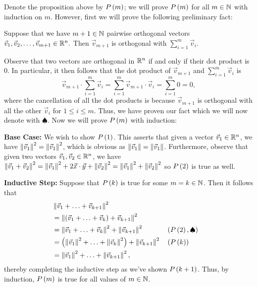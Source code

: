 \documentclass[main.tex]{subfiles}
\begin{document}
\begin{soln}
    Denote the proposition above by $P\left( m \right)$; we will prove $P\left( m \right)$ for all $m\in \mathbb N$ with induction on $m$. However, first we will prove the following preliminary fact:
    \begin{fact}
        Suppose that we have $m + 1\in \mathbb N$ pairwise orthogonal vectors $\vec{v}_{1}, \vec{v}_{2}, \ldots , \vec{v}_{m + 1} \in \mathbb R^n.$ Then $\vec{v}_{m + 1}$ is orthogonal with $\sum_{i = 1}^m \vec{v}_{i}$.
    \end{fact}
    Observe that two vectors are orthogonal in $\mathbb R^n$ if and only if their dot product is $0$. In particular, it then follows that the dot product of $\vec{v}_{m + 1}$ and $\sum_{i = 1}^m \vec{v}_{i}$ is
    \[\vec{v}_{m + 1}\cdot \sum_{i = 1}^m \vec{v}_{i} = \sum_{i = 1}^m \vec{v}_{m + 1}\cdot \vec{v}_{i} = \sum_{i = 1}^m 0 = 0,\]
    where the cancellation of all the dot products is because $\vec{v}_{m + 1}$ is orthogonal with all the other $\vec{v}_{i}$ for $1\le i\le m$. Thus, we have proven our fact which we will now denote with $\spadesuit$. Now we will prove $P\left( m \right)$ with induction:
    
    \textbf{Base Case:} We wish to show $P\left( 1 \right)$. This asserts that given a vector $\vec{v}_{1}\in \mathbb R^n$, we have $\left\lVert \vec{v}_{1} \right\rVert^2 = \left\lVert \vec{v}_{1} \right\rVert^2$, which is obvious as $\left\lVert \vec{v}_{1} \right\rVert = \left\lVert \vec{v}_{1} \right\rVert$. Furthermore, observe that given two vectors $\vec{v}_{1}, \vec{v}_{2} \in \mathbb R^n$, we have $\left\lVert \vec{v}_{1} + \vec{v}_{2} \right\rVert^2 = \left\lVert \vec{v}_{1} \right\rVert^2 + 2\vec{x}\cdot \vec{y} + \left\lVert \vec{v}_{2} \right\rVert^2 = \left\lVert \vec{v}_{1} \right\rVert^2 + \left\lVert \vec{v}_{2} \right\rVert^2$ so $P\left( 2 \right)$ is true as well.

    \textbf{Inductive Step:} Suppose that $P\left( k \right)$ is true for some $m = k\in \mathbb N$. Then it follows that
    \begin{align*}
        &\left\lVert \vec{v}_{1} + \ldots + \vec{v}_{k + 1} \right\rVert^2 \\
        &= \left\lVert \left( \vec{v}_{1} + \ldots + \vec{v}_{k} \right) + \vec{v}_{k + 1} \right\rVert^2 \\
        &= \left\lVert \vec{v}_{1} + \ldots + \vec{v}_{k} \right\rVert^2 + \left\lVert \vec{v}_{k + 1} \right\rVert^2 && \left( P\left( 2 \right), \spadesuit \right) \\
        &= \left( \left\lVert \vec{v}_{1} \right\rVert^2 + \ldots + \left\lVert \vec{v}_{k} \right\rVert^2 \right) + \left\lVert \vec{v}_{k + 1} \right\rVert^2 && \left( P\left( k \right) \right) \\
        &= \left\lVert \vec{v}_{1} \right\rVert^2 + \ldots + \left\lVert \vec{v}_{k + 1} \right\rVert^2,
    \end{align*}
    thereby completing the inductive step as we've shown $P\left( k + 1 \right)$. Thus, by induction, $P\left( m \right)$ is true for all values of $m\in \mathbb N$.
\end{soln}
\eject
\end{document}
